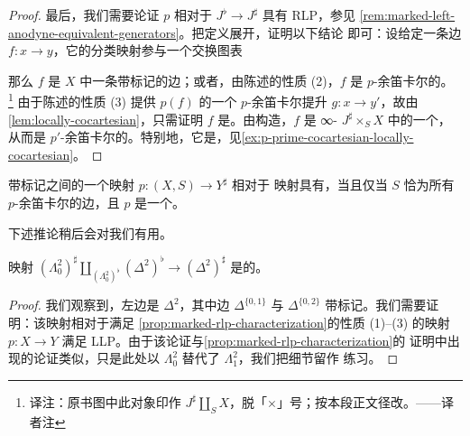 \begin{proof}
最后，我们需要论证 $p$ 相对于 $J^\flat \to J^\sharp$ 具有 RLP，参见%
\cref{rem:marked-left-anodyne-equivalent-generators}。把定义展开，证明以下结论
即可：设给定一条边 $f\colon x \to y$，它的分类映射参与一个交换图表
\begin{center}
\end{center}
那么 $f$ 是 $X$ 中一条带标记的边；或者，由陈述的性质 (2)，$f$ 是 $p$-余笛卡尔的。%
\footnote{译注：原书图中此对象印作 $J^{\sharp} \amalg_S X$，脱「$\times$」号；按本段正文径改。——译者注}
由于陈述的性质 (3) 提供 $p(f)$ 的一个 $p$-余笛卡尔提升 $g\colon x \to y'$，故由
\cref{lem:locally-cocartesian}，只需证明 $f$ 是\trLocallyCocartesian。由构造，$f$ 是
∞-\trCategory{} $J^\sharp \times_S X$ 中的一个\trEquivalence{}，从而是
$p'$-余笛卡尔的。特别地，它是\trLocallyCocartesian，见\cref{ex:p-prime-cocartesian-locally-cocartesian}。
\end{proof}

\begin{corollary}\label{cor:marked-cocartesian-rlp}
带标记\trSimplicialSet{}之间的一个映射 $p\colon (X, S) \to Y^\sharp$ 相对于%
\trMarkedLeftAnodyne{}映射具有\trRightLiftingProperty{}，当且仅当 $S$ 恰为所有
$p$-余笛卡尔的边，且 $p$ 是一个\trCocartesianFibration{}。
\end{corollary}

下述推论稍后会对我们有用。

\begin{corollary}\label{cor:lambda-marked-anodyne}
映射 $(\Lambda^2_0)^\sharp \amalg_{(\Lambda^2_0)^\flat} (\Delta^2)^\flat \to (\Delta^2)^\sharp$ 是\trMarkedAnodyne{}的。
\end{corollary}

\begin{proof}
我们观察到，左边是\trSimplicialSet{} $\Delta^2$，其中边 $\Delta^{\{0,1\}}$ 与
$\Delta^{\{0,2\}}$ 带标记。我们需要证明：该映射相对于满足%
\cref{prop:marked-rlp-characterization}的性质 (1)--(3) 的映射
$p\colon X \to Y$ 满足 LLP。由于该论证与\cref{prop:marked-rlp-characterization}的
证明中出现的论证类似，只是此处以 $\Lambda^2_0$ 替代了 $\Lambda^2_1$，我们把细节留作
练习。
\end{proof}

